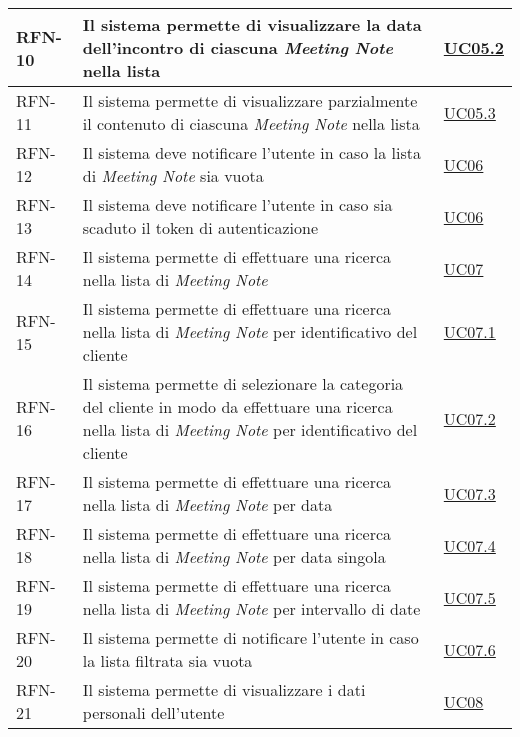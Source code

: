 \begin{table}
\begin{tabularx}{\textwidth}{lXl}
\hline
RFN-10 \label{RFN-10} & Il sistema permette di visualizzare la data dell'incontro di ciascuna \emph{Meeting Note} nella lista & \hyperref[UC05.2]{UC05.2} \\
\hline
RFN-11 \label{RFN-11} & Il sistema permette di visualizzare parzialmente il contenuto di ciascuna \emph{Meeting Note} nella lista & \hyperref[UC05.3]{UC05.3} \\
\hline
RFN-12 \label{RFN-12} & Il sistema deve notificare l'utente in caso la lista di \emph{Meeting Note} sia vuota & \hyperref[UC06]{UC06} \\
\hline
RFN-13 \label{RFN-13} & Il sistema deve notificare l'utente in caso sia scaduto il token di autenticazione & \hyperref[UC06]{UC06} \\ %
\hline
RFN-14 \label{RFN-14} & Il sistema permette di effettuare una ricerca nella lista di \emph{Meeting Note} & \hyperref[UC07]{UC07} \\
\hline
RFN-15 \label{RFN-15} & Il sistema permette di effettuare una ricerca nella lista di \emph{Meeting Note} per identificativo del cliente & \hyperref[UC07.1]{UC07.1} \\
\hline
RFN-16 \label{RFN-16} & Il sistema permette di selezionare la categoria del cliente in modo da effettuare una ricerca nella lista di \emph{Meeting Note} per identificativo del cliente & \hyperref[UC07.2]{UC07.2} \\
\hline
RFN-17 \label{RFN-17} & Il sistema permette di effettuare una ricerca nella lista di \emph{Meeting Note} per data & \hyperref[UC07.3]{UC07.3} \\
\hline
RFN-18 \label{RFN-18} & Il sistema permette di effettuare una ricerca nella lista di \emph{Meeting Note} per data singola & \hyperref[UC07.4]{UC07.4} \\
\hline
RFN-19 \label{RFN-19} & Il sistema permette di effettuare una ricerca nella lista di \emph{Meeting Note} per intervallo di date & \hyperref[UC07.5]{UC07.5} \\
\hline
RFN-20 \label{RFN-20} & Il sistema permette di notificare l'utente in caso la lista filtrata sia vuota & \hyperref[UC07.6]{UC07.6} \\
\hline
RFN-21 \label{RFN-21} & Il sistema permette di visualizzare i dati personali dell'utente & \hyperref[UC08]{UC08} \\
\hline
\end{tabularx}
\end{table}

